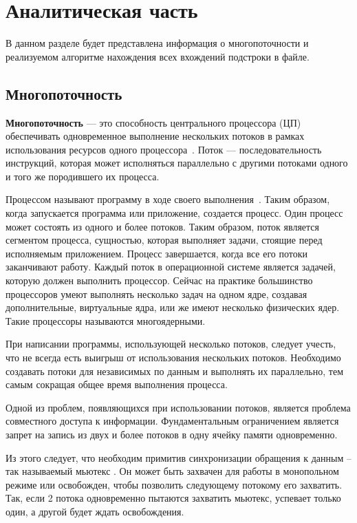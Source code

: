 \chapter{Аналитическая часть}
В данном разделе будет представлена информация о многопоточности и реализуемом алгоритме нахождения всех вхождений подстроки в файле.

\section{Многопоточность}

\textbf{Многопоточность}  --- это способность центрального процессора (ЦП) обеспечивать одновременное выполнение нескольких потоков в рамках использования ресурсов одного процессора~\cite{multithreading}.
Поток --- последовательность инструкций, которая может исполняться параллельно с другими потоками одного и того же породившего их процесса.

Процессом называют программу в ходе своего выполнения~\cite{process}.
Таким образом, когда запускается программа или приложение, создается процесс.
Один процесс может состоять из одного и более потоков.
Таким образом, поток является сегментом процесса, сущностью, которая выполняет задачи, стоящие перед исполняемым приложением.
Процесс завершается, когда все его потоки заканчивают работу.
Каждый поток в операционной системе является задачей, которую должен выполнить процессор.
Сейчас на практике большинство процессоров умеют выполнять несколько задач на одном ядре, создавая дополнительные, виртуальные ядра, или же имеют несколько физических ядер.
Такие процессоры называются многоядерными.

При написании программы, использующей несколько потоков, следует учесть, что не всегда есть выигрыш от использования нескольких потоков.
Необходимо создавать потоки для независимых по данным и выполнять их параллельно, тем самым сокращая общее время выполнения процесса.

Одной из проблем, появляющихся при использовании потоков, является проблема совместного доступа к информации.
Фундаментальным ограничением является запрет на запись из двух и более потоков в одну ячейку памяти одновременно.

Из этого следует, что необходим примитив синхронизации обращения к данным -- так называемый мьютекс .
Он может быть захвачен для работы в монопольном режиме или освобожден, чтобы позволить следующему потокому его захватить.
Так, если 2 потока одновременно пытаются захватить мьютекс, успевает только один, а другой будет ждать освобождения.

